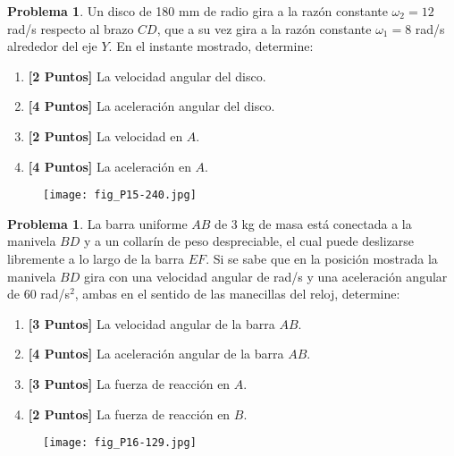 \documentclass[ a4paper, twoside, 11pt]{article}
\newcommand{\tsup}[1]{\ensuremath{^{\text{#1}}}}
\theoremstyle{definition}
\newtheorem{problem}[definition]{Problema}
\begin{document}
\begin{problem}
Un disco de 180 mm de radio gira a la raz\'on constante $\omega_2 = 12$ rad/s respecto al brazo $CD$, que a su vez gira a la raz\'on constante $\omega_1 = 8$ rad/s alrededor del eje $Y$. \linebreak En el instante mostrado, determine: 
\begin{enumerate}[label=\alph*.]
\item \textbf{[2 Puntos]} La velocidad angular del disco. 
\item \textbf{[4 Puntos]} La aceleraci\'on angular del disco. 
\item \textbf{[2 Puntos]} La velocidad en $A$. 
\item \textbf{[4 Puntos]} La aceleraci\'on en $A$. 
\end{enumerate}

\begin{figure}[htb]
\centering
\texttt{[image: fig\_P15-240.jpg]}
\end{figure}

\end{problem}
\vspace{\baselineskip}

\begin{problem}
La barra uniforme $AB$ de 3 kg de masa est\'a conectada a la manivela $BD$ y a un collar\'in de peso despreciable, el cual puede deslizarse libremente a lo largo de la barra $EF$. \linebreak Si se sabe que en la posici\'on mostrada la manivela $BD$ gira con una velocidad angular de  rad/s y una aceleraci\'on angular de 60 rad/s\tsup{2}, ambas en el sentido de las manecillas del reloj, \linebreak determine: 
\begin{enumerate}[label=\alph*.]
\item \textbf{[3 Puntos]} La velocidad angular de la barra $AB$. 
\item \textbf{[4 Puntos]} La aceleraci\'on angular de la barra $AB$. 
\item \textbf{[3 Puntos]} La fuerza de reacci\'on en $A$. 
\item \textbf{[2 Puntos]} La fuerza de reacci\'on en $B$. 
\end{enumerate}

\begin{figure}[htb]
\centering
\texttt{[image: fig\_P16-129.jpg]}
\end{figure}

\end{problem}
\vspace{\baselineskip}
\end{document}
